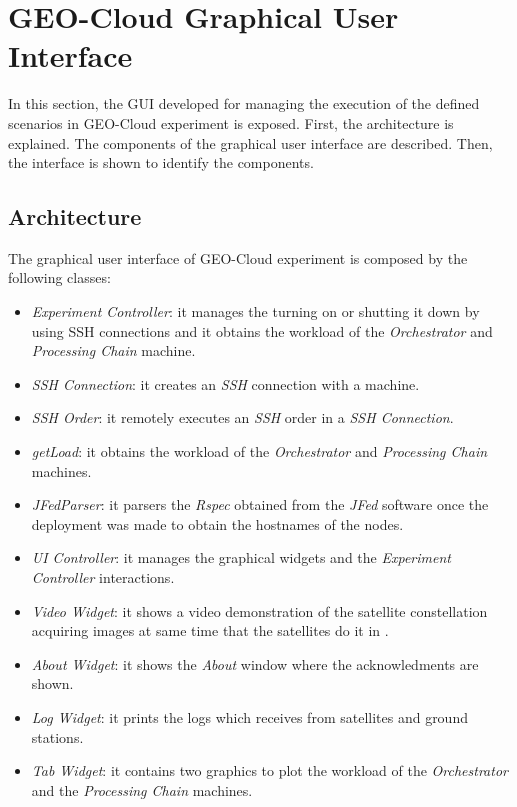 \section{GEO-Cloud Graphical User Interface}
\label{sec:interfaz}
In this section, the \ac{GUI} developed for managing the execution of the defined
scenarios in GEO-Cloud experiment is exposed. First, the architecture is
explained. The components of the graphical user interface are described. Then, the interface is shown to identify the components.

\subsection{Architecture}

The graphical user interface of GEO-Cloud experiment is composed by the following classes:

\begin{itemize}

\item \emph{Experiment Controller}: it manages the \sss turning on or shutting it down by using \ac{SSH} connections and it obtains the workload of the \emph{Orchestrator} and \emph{Processing Chain} machine.
\item \emph{SSH Connection}: it creates an \emph{SSH} connection with a \vw machine.
\item \emph{SSH Order}: it remotely executes an  \emph{SSH} order in a \emph{SSH Connection}.
\item \emph{getLoad}: it obtains the workload of the \emph{Orchestrator} and \emph{Processing Chain} machines.
\item \emph{JFedParser}: it parsers the \emph{Rspec} obtained from the \emph{JFed} software once the \vw deployment was made to obtain the hostnames of the \vw nodes.
\item \emph{UI Controller}: it manages the graphical widgets and the \emph{Experiment Controller} interactions.
\item \emph{Video Widget}: it shows a video demonstration of the satellite constellation acquiring images at same time that the satellites do it in \vw.
\item \emph{About Widget}: it shows the \emph{About} window where the acknowledments are shown.
\item \emph{Log Widget}: it prints the logs which receives from satellites and ground stations.
\item \emph{Tab Widget}: it contains two graphics to plot the workload of the \emph{Orchestrator} and the \emph{Processing Chain} machines.
\end{itemize}

